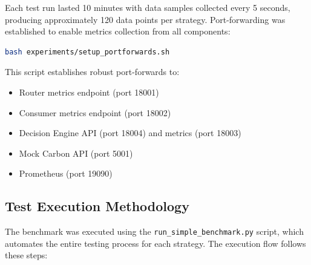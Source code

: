 Each test run lasted 10 minutes with data samples collected every 5 seconds, producing approximately 120 data points per strategy. Port-forwarding was established to enable metrics collection from all components:

\begin{lstlisting}[language=bash,caption={Port-forward setup for metrics collection.},label=lst:portforward-setup]
bash experiments/setup_portforwards.sh
\end{lstlisting}

This script establishes robust port-forwards to:
\begin{itemize}
    \item Router metrics endpoint (port 18001)
    \item Consumer metrics endpoint (port 18002)
    \item Decision Engine API (port 18004) and metrics (port 18003)
    \item Mock Carbon API (port 5001)
    \item Prometheus (port 19090)
\end{itemize}

\subsection{Test Execution Methodology}

The benchmark was executed using the \texttt{run\_simple\_benchmark.py} script, which automates the entire testing process for each strategy. The execution flow follows these steps:

